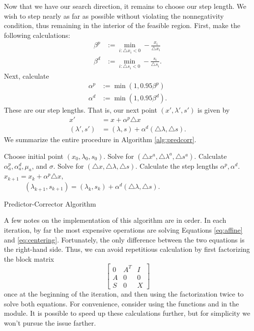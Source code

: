 Now that we have our search direction, it remains to choose our step length. We wish to step nearly as far as possible without
violating the nonnegativity condition, thus remaining in the interior of the feasible region. First, make the following
calculations:
\begin{align*}
\beta^p &:= \displaystyle\min_{i : \triangle x_i < 0}-\frac{x_i}{\triangle x_i}\\
\beta^d &:= \displaystyle\min_{i : \triangle s_i < 0}-\frac{s_i}{\triangle s_i}.
\end{align*}
Next, calculate
\begin{align*}
\alpha^p &:= \min(1, 0.95\beta^p)\\
\alpha^d &:= \min(1, 0.95\beta^d).
\end{align*}
These are our step lengths. That is, our next point $(x', \lambda', s')$ is given by
\begin{align*}
x' &= x + \alpha^p\triangle x\\
(\lambda', s') &= (\lambda, s) + \alpha^d(\triangle \lambda, \triangle s).
\end{align*}
We summarize the entire procedure in Algorithm \ref{alg:predcorr}.
\begin{algorithm}
\begin{algorithmic}[1]
    \State \textrm{Choose initial point } $(x_0, \lambda_0, s_0)$.
        \State \textrm{Solve for } $(\triangle x^a, \triangle \lambda^a, \triangle s^a)$.
        \State \textrm{Calculate } $\alpha_a^p, \alpha_a^d, \mu_a$, \textrm{and} $\sigma$.
        \State \textrm{Solve for } $(\triangle x, \triangle \lambda, \triangle s)$.
        \State \textrm{Calculate the step lengths } $\alpha^p, \alpha^d$.
        \State $x_{k+1} = x_k + \alpha^p\triangle x$,\\
        $\qquad\quad(\lambda_{k+1}, s_{k+1}) = (\lambda_k, s_k) + \alpha^d(\triangle \lambda, \triangle s)$.
    \EndFor
\EndProcedure
\end{algorithmic}
\caption{Predictor-Corrector Algorithm}
\label{alg:predcorr}
\end{algorithm}

A few notes on the implementation of this algorithm are in order. 
In each iteration, by far the most expensive operations are solving Equations \ref{eq:affine} and 
\ref{eq:centering}. Fortunately, the only difference between the two equations is the right-hand side.
Thus, we can avoid repetitious calculation by first factorizing the block matrix
\[
\begin{bmatrix}
0 & A^T & I\\
A & 0 & 0\\
S & 0 & X
\end{bmatrix}
\]
once at the beginning of the iteration, and then using the factorization twice to solve both equations.
For convenience, consider using the functions  and  in the 
module. It is possible to speed up these calculations further, but for simplicity we won't pursue the issue
farther.

